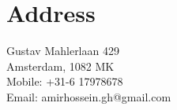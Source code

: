 \section{Address}

\begin{flushleft}
  Gustav Mahlerlaan 429 \\
  Amsterdam, 1082 MK \\
  Mobile: +31-6 17978678 \\
  Email: amirhossein.gh@gmail.com \\
\end{flushleft}

